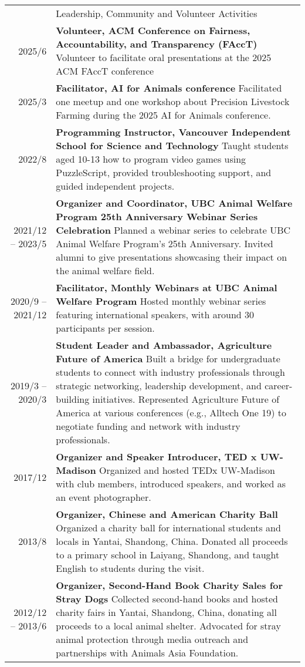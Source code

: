 \documentclass[letterpaper, 11pt]{article}
\newcommand{\headingfont}{\Large\color{OliveGreen}}
\newenvironment{SectionTable}[1]{
	\renewcommand*{\arraystretch}{1.7}
	\setlength{\tabcolsep}{10pt}
	\begin{longtable}{Rp{5.2in}} & #1 \\}
{\end{longtable}\vspace{-.3cm}}
\begin{document}
\begin{SectionTable}{\headingfont Leadership, Community and Volunteer Activities}
2025/6 &
\textbf{Volunteer, ACM Conference on Fairness, Accountability, and Transparency (FAccT)} \newline
Volunteer to facilitate oral presentations at the 2025 ACM FAccT conference  \\
2025/3 &
\textbf{Facilitator, AI for Animals conference} \newline
Facilitated one meetup and one workshop about Precision Livestock Farming during the 2025 AI for Animals conference. \\
2022/8 &
\textbf{Programming Instructor, Vancouver Independent School for Science and Technology} \newline
Taught students aged 10-13 how to program video games using PuzzleScript, provided troubleshooting support, and guided independent projects. \\
2021/12 -- 2023/5 &
\textbf{Organizer and Coordinator, UBC Animal Welfare Program 25th Anniversary Webinar Series Celebration} \newline
Planned a webinar series to celebrate UBC Animal Welfare Program's 25th Anniversary. Invited alumni to give presentations showcasing their impact on the animal welfare field. \\
2020/9 -- 2021/12 &
\textbf{Facilitator, Monthly Webinars at UBC Animal Welfare Program} \newline
Hosted monthly webinar series featuring international speakers, with around 30 participants per session. \\
2019/3 -- 2020/3 &
\textbf{Student Leader and Ambassador, Agriculture Future of America} \newline
Built a bridge for undergraduate students to connect with industry professionals through strategic networking, leadership development, and career-building initiatives. Represented Agriculture Future of America at various conferences (e.g., Alltech One 19) to negotiate funding and network with industry professionals. \\
2017/12 &
\textbf{Organizer and Speaker Introducer, TED x UW-Madison} \newline
Organized and hosted TEDx UW-Madison with club members, introduced speakers, and worked as an event photographer. \\
2013/8 &
\textbf{Organizer, Chinese and American Charity Ball} \newline
Organized a charity ball for international students and locals in Yantai, Shandong, China. Donated all proceeds to a primary school in Laiyang, Shandong, and taught English to students during the visit. \\
2012/12 -- 2013/6 &
\textbf{Organizer, Second-Hand Book Charity Sales for Stray Dogs} \newline
Collected second-hand books and hosted charity fairs in Yantai, Shandong, China, donating all proceeds to a local animal shelter. Advocated for stray animal protection through media outreach and partnerships with Animals Asia Foundation. \\
\end{SectionTable}
\end{document}
